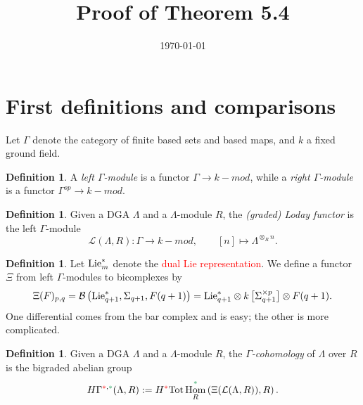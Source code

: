 \documentclass[11pt,reqno
,draft
]{amsart}
\title{Proof of Theorem 5.4}
\date{\today}
\numberwithin{equation}{section}
\numberwithin{figure}{section}
\theoremstyle{definition} %
\newtheorem{definition}[equation]{Definition}%
\DeclareMathOperator{\Hom}{Hom}%
\newcommand{\Ksi}{\Xi}
\newcommand{\Lie}{\mathrm{Lie}}
\newcommand{\Loday}{\mathcal L}
\newcommand{\redstar}{{\color{red}\**}}
\newcommand{\greenstar}{{\color{ForestGreen}\**}}
\begin{document}


 \maketitle


\section{First definitions and comparisons}


Let $\Gamma$ denote the category of finite based sets and based maps, and $k$ a fixed ground field.
\begin{definition}
        A \textit{left $\Gamma$-module} is a functor $\Gamma \to k-mod$, while a
        \textit{right $\Gamma$-module} is a functor $\Gamma^{op} \to k-mod$.
\end{definition}

\begin{definition}
        Given a DGA $\Lambda$ and a $\Lambda$-module $R$, the \textit{(graded) Loday functor} is the left $\Gamma$-module
        \[
                \Loday(\Lambda, R) \colon \Gamma \to k-mod,
                \qquad
                [n] \mapsto \Lambda^{\otimes_R n}.
        \]
\end{definition}

\begin{definition}
        Let $\Lie_m^{\**}$ denote the \textcolor{red}{dual Lie representation}.
        We define a functor $\Ksi$ from left $\Gamma$-modules to bicomplexes by
        \[
                \Ksi(F)_{p,q} = \mathcal B \left( \Lie_{q+1}^{\**}, \Sigma_{q+1}, F(q+1) \right)
                = \Lie_{q+1}^{\**} \otimes k\left[\Sigma_{q+1}^{\times p}\right] \otimes F(q+1).
        \]
        One differential comes from the bar complex and is easy; the other is more complicated.
\end{definition}

\begin{definition}
        Given a DGA $\Lambda$ and a $\Lambda$-module $R$, the \textit{$\Gamma$-cohomology} of $\Lambda$ over $R$ is the bigraded abelian group
        \[
                H\Gamma^{\redstar, \greenstar}(\Lambda, R) := H^{\redstar} \mathrm{Tot} \Hom_R^{\greenstar} \left( \Ksi(\Loday(\Lambda, R)), R \right).
        \]
\end{definition}
\end{document}
